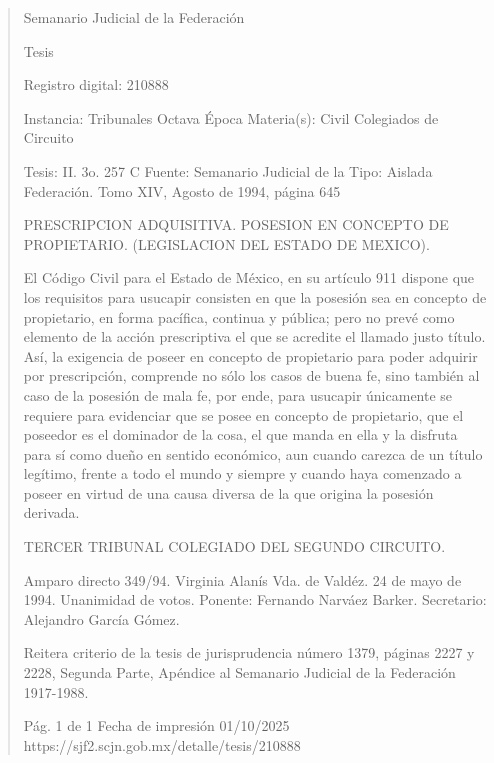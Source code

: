\documentclass[11pt,a4paper]{article}
\begin{document}
\begin{quote}
                                                   Semanario Judicial de la Federación

                                                  Tesis

 Registro digital: 210888

 Instancia: Tribunales            Octava Época                         Materia(s): Civil
 Colegiados de Circuito

 Tesis: II. 3o. 257 C             Fuente: Semanario Judicial de la     Tipo: Aislada
                                  Federación.
                                  Tomo XIV, Agosto de 1994, página
                                  645


PRESCRIPCION ADQUISITIVA. POSESION EN CONCEPTO DE PROPIETARIO. (LEGISLACION
DEL ESTADO DE MEXICO).


El Código Civil para el Estado de México, en su artículo 911 dispone que los requisitos para
usucapir consisten en que la posesión sea en concepto de propietario, en forma pacífica, continua y
pública; pero no prevé como elemento de la acción prescriptiva el que se acredite el llamado justo
título. Así, la exigencia de poseer en concepto de propietario para poder adquirir por prescripción,
comprende no sólo los casos de buena fe, sino también al caso de la posesión de mala fe, por
ende, para usucapir únicamente se requiere para evidenciar que se posee en concepto de
propietario, que el poseedor es el dominador de la cosa, el que manda en ella y la disfruta para sí
como dueño en sentido económico, aun cuando carezca de un título legítimo, frente a todo el
mundo y siempre y cuando haya comenzado a poseer en virtud de una causa diversa de la que
origina la posesión derivada.

TERCER TRIBUNAL COLEGIADO DEL SEGUNDO CIRCUITO.


Amparo directo 349/94. Virginia Alanís Vda. de Valdéz. 24 de mayo de 1994. Unanimidad de votos.
Ponente: Fernando Narváez Barker. Secretario: Alejandro García Gómez.

Reitera criterio de la tesis de jurisprudencia número 1379, páginas 2227 y 2228, Segunda Parte,
Apéndice al Semanario Judicial de la Federación 1917-1988.




                                             Pág. 1 de 1            Fecha de impresión 01/10/2025
  https://sjf2.scjn.gob.mx/detalle/tesis/210888

\end{quote}
\end{document}
